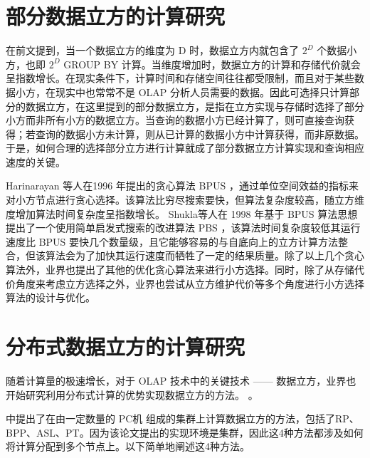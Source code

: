 \section{部分数据立方的计算研究}

在前文提到，当一个数据立方的维度为 D 时，数据立方内就包含了 ${2}^{D}$ 个数据小方，也即 ${2}^{D}$ GROUP BY 计算。当维度增加时，数据立方的计算和存储代价就会呈指数增长。在现实条件下，计算时间和存储空间往往都受限制，而且对于某些数据小方，在现实中也常常不是 OLAP 分析人员需要的数据。因此可选择只计算部分的数据立方，在这里提到的部分数据立方，是指在立方实现与存储时选择了部分小方而非所有小方的数据立方。当查询的数据小方已经计算了，则可直接查询获得；若查询的数据小方未计算，则从已计算的数据小方中计算获得，而非原数据。于是，如何合理的选择部分立方进行计算就成了部分数据立方计算实现和查询相应速度的关键。

Harinarayan 等人在1996 年提出的贪心算法 BPUS \cite{harinarayan1996implementing} ，通过单位空间效益的指标来对小方节点进行贪心选择。该算法比穷尽搜索要快，但算法复杂度较高，随立方维度增加算法时间复杂度呈指数增长。 Shukla等人在 1998 年基于 BPUS 算法思想提出了一个使用简单启发式搜索的改进算法 PBS \cite{shukla1998materialized} ，该算法时间复杂度较低其运行速度比 BPUS 要快几个数量级，且它能够容易的与自底向上的立方计算方法整合，但该算法会为了加快其运行速度而牺牲了一定的结果质量。除了以上几个贪心算法外，业界也提出了其他的优化贪心算法来进行小方选择。同时，除了从存储代价角度来考虑立方选择之外，业界也尝试从立方维护代价等多个角度进行小方选择算法的设计与优化。

\section{分布式数据立方的计算研究}

随着计算量的极速增长，对于 OLAP 技术中的关键技术 —— 数据立方，业界也开始研究利用分布式计算的优势实现数据立方的方法。\cite{nandi2011distributed} \cite{dehne2006cgmcube} \cite{ng2001iceberg} \cite{lee2012efficient}。

\cite{ng2001iceberg} 中提出了在由一定数量的 PC机 组成的集群上计算数据立方的方法，包括了RP、BPP、ASL、PT。因为该论文提出的实现环境是集群，因此这4种方法都涉及如何将计算分配到多个节点上。以下简单地阐述这4种方法。

